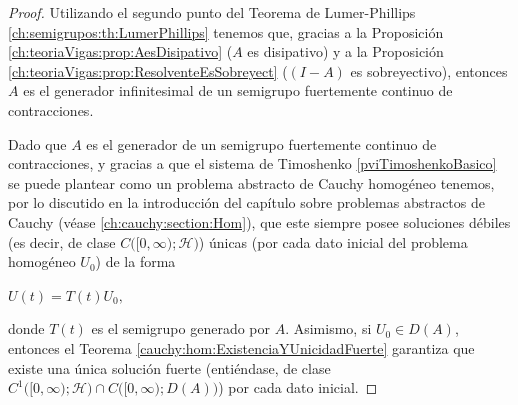 \begin{proof}
    Utilizando el segundo punto del Teorema de Lumer-Phillips \eqref{ch:semigrupos:th:LumerPhillips} tenemos que, gracias a la Proposición \eqref{ch:teoriaVigas:prop:AesDisipativo} ($A$ es disipativo) y a la Proposición \eqref{ch:teoriaVigas:prop:ResolventeEsSobreyect} ($(I-A)$ es sobreyectivo), entonces $A$ es el generador infinitesimal de un semigrupo fuertemente continuo de contracciones.

    Dado que $A$ es el generador de un semigrupo fuertemente continuo de contracciones, y gracias a que el sistema de Timoshenko \eqref{pviTimoshenkoBasico} se puede plantear como un problema abstracto de Cauchy homogéneo tenemos, por lo discutido en la introducción del capítulo sobre problemas abstractos de Cauchy (véase \ref{ch:cauchy:section:Hom}), que este siempre posee soluciones débiles (es decir, de clase $C\big([0,\infty);\mathcal{H}\big)$) únicas (por cada dato inicial del problema homogéneo $U_0$) de la forma 

    $U(t) = T(t)U_0,$

    donde $T(t)$ es el semigrupo generado por $A$. Asimismo, si $U_0 \in D(A)$, entonces el Teorema \eqref{cauchy:hom:ExistenciaYUnicidadFuerte} garantiza que existe una única solución fuerte (entiéndase, de clase $C^1\big([0,\infty);\mathcal{H}\big) \cap C\big([0,\infty) ; D(A)\big)$) por cada dato inicial. 
\end{proof}